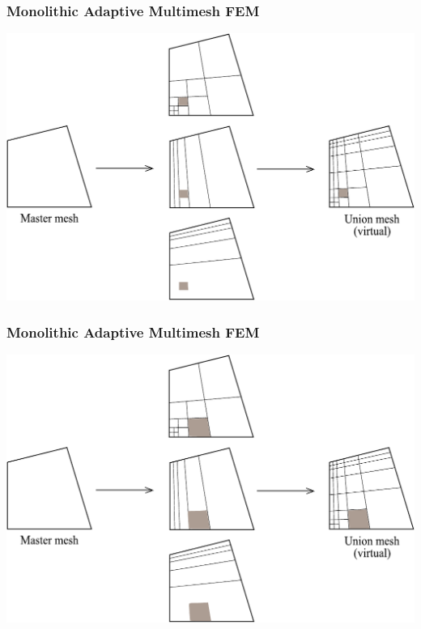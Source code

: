 \begin{frame}
  \frametitle{Monolithic Adaptive Multimesh FEM}
  \begin{center}
    \includegraphics[height=0.7\textheight]{multimesh/mm_8.pdf}
  \end{center}
\end{frame}

\begin{frame}
  \frametitle{Monolithic Adaptive Multimesh FEM}
  \begin{center}
    \includegraphics[height=0.7\textheight]{multimesh/mm_9.pdf}
  \end{center}
\end{frame}

